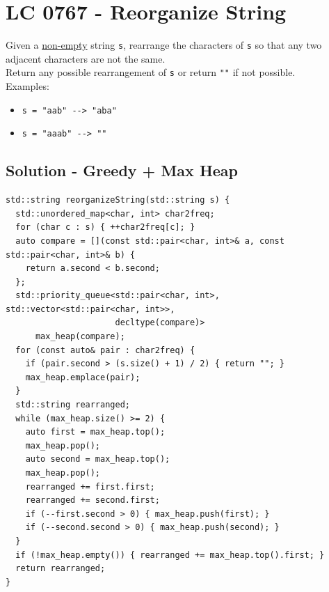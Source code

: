 \section{LC 0767 - Reorganize String}
Given a \ul{non-empty} string {\colorbox{CodeBackground}{\lstinline|s|}}, rearrange the characters of {\colorbox{CodeBackground}{\lstinline|s|}} so that any two adjacent characters are not the same.\\

Return any possible rearrangement of {\colorbox{CodeBackground}{\lstinline|s|}} or return {\colorbox{CodeBackground}{\lstinline|""|}} if not possible.\\

Examples:
\begin{itemize}
\item {\colorbox{CodeBackground}{\lstinline|s = "aab" --> "aba"|}}
\item {\colorbox{CodeBackground}{\lstinline|s = "aaab" --> ""|}}
\end{itemize}

\subsection*{Solution - Greedy + Max Heap}
{\color{magenta}{The greedy part of this algorithm is in repeatedly picking the most frequent remaining character that doesn't match the last character placed.}}
\begin{lstlisting}
std::string reorganizeString(std::string s) {
  std::unordered_map<char, int> char2freq;
  for (char c : s) { ++char2freq[c]; }
  auto compare = [](const std::pair<char, int>& a, const std::pair<char, int>& b) {
    return a.second < b.second;
  };
  std::priority_queue<std::pair<char, int>, std::vector<std::pair<char, int>>,
                      decltype(compare)>
      max_heap(compare);
  for (const auto& pair : char2freq) {
    if (pair.second > (s.size() + 1) / 2) { return ""; }
    max_heap.emplace(pair);
  }
  std::string rearranged;
  while (max_heap.size() >= 2) {
    auto first = max_heap.top();
    max_heap.pop();
    auto second = max_heap.top();
    max_heap.pop();
    rearranged += first.first;
    rearranged += second.first;
    if (--first.second > 0) { max_heap.push(first); }
    if (--second.second > 0) { max_heap.push(second); }
  }
  if (!max_heap.empty()) { rearranged += max_heap.top().first; }
  return rearranged;
}
\end{lstlisting}

